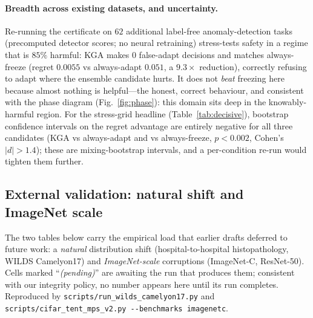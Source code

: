 \documentclass[11pt]{article}
\theoremstyle{plain}
\theoremstyle{definition}
\begin{document}
\paragraph{Breadth across existing datasets, and uncertainty.} Re-running the certificate on
$62$ additional label-free anomaly-detection tasks (precomputed detector scores; no neural
retraining) stress-tests safety in a regime that is $85\%$ harmful: \textsc{KGA} makes $0$
false-adapt decisions and matches always-freeze (regret $0.0055$ vs always-adapt $0.051$, a
$9.3\times$ reduction), correctly refusing to adapt where the ensemble candidate hurts. It does
not \emph{beat} freezing here because almost nothing is helpful---the honest, correct behaviour,
and consistent with the phase diagram (Fig.~\ref{fig:phase}): this domain sits deep in the
knowably-harmful region. For the stress-grid headline (Table~\ref{tab:decisive}), bootstrap
confidence intervals on the regret advantage are entirely negative for all three candidates
(\textsc{KGA} vs always-adapt and vs always-freeze, $p<0.002$, Cohen's $|d|>1.4$); these are
mixing-bootstrap intervals, and a per-condition re-run would tighten them further.

\subsection{External validation: natural shift and ImageNet scale}\label{sec:external}
The two tables below carry the empirical load that earlier drafts deferred to future work:
a \emph{natural} distribution shift (hospital-to-hospital histopathology, WILDS Camelyon17)
and \emph{ImageNet-scale} corruptions (ImageNet-C, ResNet-50). Cells marked
``\textit{(pending)}'' are awaiting the run that produces them; consistent with our integrity
policy, no number appears here until its run completes. Reproduced by
\texttt{scripts/run\_wilds\_camelyon17.py} and
\texttt{scripts/cifar\_tent\_mps\_v2.py -{}-benchmarks imagenetc}.
\end{document}
